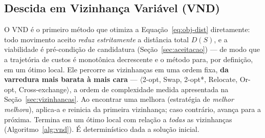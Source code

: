 \documentclass[12pt, a4paper]{article}
\begin{document}
\subsection{Descida em Vizinhança Variável (VND)}\label{sec:vnd}
O VND \citep{hansen2001variable} é o primeiro método que otimiza a Equação~\eqref{eq:obj-dist} diretamente: todo movimento aceito \emph{reduz estritamente} a distância total $D(S)$, e a viabilidade é pré-condição de candidatura (Seção~\ref{sec:aceitacao}) --- de modo que a trajetória de custos é monotônica decrescente e o método para, por definição, em um ótimo local. Ele percorre as vizinhanças em uma ordem fixa, \textbf{da varredura mais barata à mais cara} --- $\langle$2-opt, Swap, 2-opt\hspace{0.5pt}*, Relocate, Or-opt, Cross-exchange$\rangle$, a ordem de complexidade medida apresentada na Seção~\ref{sec:vizinhancas}. Ao encontrar uma melhora (estratégia de \emph{melhor melhora}), aplica-a e reinicia da primeira vizinhança; caso contrário, avança para a próxima. Termina em um ótimo local com relação a \emph{todas} as vizinhanças (Algoritmo~\ref{alg:vnd}). É determinístico dada a solução inicial.

\begin{algorithm}[H]
\caption{\textsc{VND} --- Descida em Vizinhança Variável}\label{alg:vnd}
\begin{algorithmic}[1]
\label{vnd:init}
  \label{vnd:find}
    \label{vnd:apply}
  \ELSE
    \label{vnd:next}
  \ENDIF
\ENDWHILE
{}
\end{algorithmic}
\end{algorithm}
\end{document}

